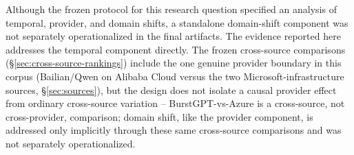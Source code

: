 Although the frozen protocol for this research question specified an analysis of temporal, provider, and domain shifts, a standalone domain-shift component was not separately operationalized in the final artifacts. The evidence reported here addresses the temporal component directly. The frozen cross-source comparisons (\S\ref{sec:cross-source-rankings}) include the one genuine provider boundary in this corpus (Bailian/Qwen on Alibaba Cloud versus the two Microsoft-infrastructure sources, \S\ref{sec:sources}), but the design does not isolate a causal provider effect from ordinary cross-source variation -- BurstGPT-vs-Azure is a cross-source, not cross-provider, comparison; domain shift, like the provider component, is addressed only implicitly through these same cross-source comparisons and was not separately operationalized.

